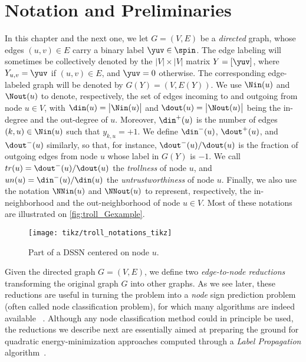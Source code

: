 \section{Notation and Preliminaries}\label{s:prel}

In this chapter and the next one, we let $G=(V,E)$ be a \emph{directed} graph, whose edges $(u,v)
\in E$ carry a
binary label $\yuv\in \spin$. The edge labeling will sometimes be collectively denoted by the
$|V|\times |V|$ matrix $Y = [\yuv]$, where $Y_{u,v} = \yuv$ if $(u,v) \in E$, and $\yuv = 0$
otherwise. The corresponding edge-labeled graph will be denoted by $G(Y) = (V,E(Y))$. We use
$\Nin(u)$ and $\Nout(u)$ to denote, respectively, the set of edges incoming to and outgoing from
node $u \in V$, with $\din(u) = \big|\Nin(u)\big|$ and $\dout(u) = \big|\Nout(u)\big|$ being the
in-degree and the out-degree of $u$. Moreover, $\din^+(u)$ is the number of edges $(k,u)\in\Nin(u)$
such that $y_{k,u} = +1$. We define $\din^-(u)$, $\dout^+(u)$, and $\dout^-(u)$ similarly, so that,
for instance, $\dout^-(u)/\dout(u)$ is the fraction of outgoing edges from node $u$ whose label in
$G(Y)$ is $-1$. We call $tr(u) = \dout^-(u)/\dout(u)$ the \emph{trollness} of node $u$, and $un(u)
= \din^-(u)/\din(u)$ the \emph{untrustworthiness} of node $u$. Finally, we also use the notation
$\NNin(u)$ and $\NNout(u)$ to represent, respectively, the in-neighborhood and the out-neighborhood
of node $u \in V$. Most of these notations are illustrated on \autoref{fig:troll_Gexample}.
\begin{figure}[hbpt]
  \centering
  \texttt{[image: tikz/troll\_notations\_tikz]}
  \caption{Part of a DSSN centered on node $u$. \label{fig:troll_Gexample}}
\end{figure}

Given the directed graph $G = (V,E)$, we define two \emph{edge-to-node reductions} transforming the
original graph $G$ into other graphs. As we see later, these reductions are useful in turning the
\esp{} problem into a \emph{node} sign prediction problem (often called node
classification problem), for which many algorithms are indeed available~%
\autocites{BC01}{LabelPropa03}{BDL06}{HP07}{HLP09}{Vitale2012}{HPV12}{WTA13}{HPG15}.  Although any
node classification method could in principle be used, the reductions we describe next are
essentially aimed at preparing the ground for quadratic energy-minimization approaches computed
through a \emph{Label Propagation} algorithm~\autocites{LabelPropa03}{BDL06}.

